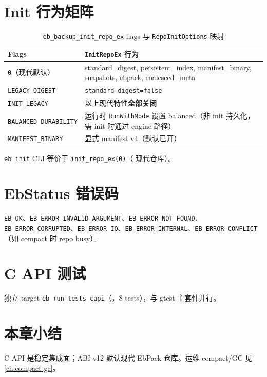 \section{Init 行为矩阵}

\begin{table}[htbp]
\centering
\caption{\texttt{eb\_backup\_init\_repo\_ex} flags 与 \texttt{RepoInitOptions} 映射}
\small
\begin{tabular}{@{}ll@{}}
\toprule
Flags & \texttt{InitRepoEx} 行为 \\
\midrule
\texttt{0}（现代默认） & standard\_digest, persistent\_index, manifest\_binary, snapshots, ebpack, coalesced\_meta \\
\texttt{LEGACY\_DIGEST} & \texttt{standard\_digest=false} \\
\texttt{INIT\_LEGACY} & 以上现代特性\textbf{全部关闭} \\
\texttt{BALANCED\_DURABILITY} & 运行时 \texttt{RunWithMode} 设置 balanced（非 init 持久化，需 init 时通过 engine 路径） \\
\texttt{MANIFEST\_BINARY} & 显式 manifest v4（默认已开） \\
\bottomrule
\end{tabular}
\end{table}

\texttt{eb init} CLI 等价于 \texttt{init\_repo\_ex(0)}（ 现代仓库）。

\section{EbStatus 错误码}

\texttt{EB\_OK}、\texttt{EB\_ERROR\_INVALID\_ARGUMENT}、\texttt{EB\_ERROR\_NOT\_FOUND}、\texttt{EB\_ERROR\_CORRUPTED}、\texttt{EB\_ERROR\_IO}、\texttt{EB\_ERROR\_INTERNAL}、\texttt{EB\_ERROR\_CONFLICT}（如 compact 时 repo busy）。

\section{C API 测试}

独立 target \texttt{eb\_run\_tests\_capi}（，8 tests），与 gtest 主套件并行。

\section{本章小结}

C API 是稳定集成面；ABI v12 默认现代 EbPack 仓库。运维 compact/GC 见 \cref{ch:compact-gc}。
